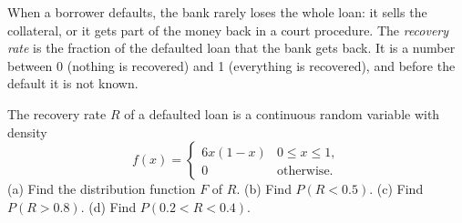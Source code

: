 
\begin{problem}
	\begin{context}
		When a borrower defaults, the bank rarely loses the whole loan: it sells
		the collateral, or it gets part of the money back in a court procedure.
		The \emph{recovery rate} is the fraction of the defaulted loan that the
		bank gets back. It is a number between 0 (nothing is recovered) and 1
		(everything is recovered), and before the default it is not known.
	\end{context}
	The recovery rate $R$ of a defaulted loan is a continuous random variable
	with density
	\[
		f(x)=\begin{cases}
			6x(1-x) & 0\le x\le 1, \\
			0       & \text{otherwise}.
		\end{cases}
	\]
	(a) Find the distribution function $F$ of $R$.
	(b) Find $P(R<0.5)$.
	(c) Find $P(R>0.8)$.
	(d) Find $P(0.2<R<0.4)$.
\end{problem}

